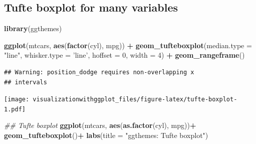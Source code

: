 \documentclass[]{krantz}
\makeatletter
\newenvironment{Shaded}{\begin{snugshade}}{\end{snugshade}}
\newcommand{\CommentTok}[1]{\textcolor[rgb]{0.56,0.35,0.01}{\textit{#1}}}
\newcommand{\DataTypeTok}[1]{\textcolor[rgb]{0.13,0.29,0.53}{#1}}
\newcommand{\DecValTok}[1]{\textcolor[rgb]{0.00,0.00,0.81}{#1}}
\newcommand{\KeywordTok}[1]{\textcolor[rgb]{0.13,0.29,0.53}{\textbf{#1}}}
\newcommand{\NormalTok}[1]{#1}
\newcommand{\OperatorTok}[1]{\textcolor[rgb]{0.81,0.36,0.00}{\textbf{#1}}}
\newcommand{\StringTok}[1]{\textcolor[rgb]{0.31,0.60,0.02}{#1}}
\newenvironment{kframe}{%
\medskip{}
\setlength{\fboxsep}{.8em}
 \def\at@end@of@kframe{}%
 \ifinner\ifhmode%
  \def\at@end@of@kframe{\end{minipage}}%
  \begin{minipage}{\columnwidth}%
 \fi\fi%
 \def\FrameCommand##1{\hskip\@totalleftmargin \hskip-\fboxsep
 \colorbox{shadecolor}{##1}\hskip-\fboxsep
     \hskip-\linewidth \hskip-\@totalleftmargin \hskip\columnwidth}%
 \MakeFramed {\advance\hsize-\width
   \@totalleftmargin\z@ \linewidth\hsize
   \@setminipage}}%
 {\par\unskip\endMakeFramed%
 \at@end@of@kframe}
\renewenvironment{Shaded}{\begin{kframe}}{\end{kframe}}
\makeatother
\begin{document}
\begin{Shaded}
\end{Shaded}

\hypertarget{tufte-boxplot-for-many-variables}{%
\subsection{Tufte boxplot for many variables}\label{tufte-boxplot-for-many-variables}}

\begin{Shaded}
\begin{Highlighting}[]
\KeywordTok{library}\NormalTok{(ggthemes)}

\KeywordTok{ggplot}\NormalTok{(mtcars, }\KeywordTok{aes}\NormalTok{(}\KeywordTok{factor}\NormalTok{(cyl), mpg)) }\OperatorTok{+}
\StringTok{  }\KeywordTok{geom_tufteboxplot}\NormalTok{(}\DataTypeTok{median.type =} \StringTok{"line"}\NormalTok{, }\DataTypeTok{whisker.type =} \StringTok{'line'}\NormalTok{, }\DataTypeTok{hoffset =} \DecValTok{0}\NormalTok{, }\DataTypeTok{width =} \DecValTok{4}\NormalTok{) }\OperatorTok{+}
\StringTok{  }\KeywordTok{geom_rangeframe}\NormalTok{() }
\end{Highlighting}
\end{Shaded}

\begin{verbatim}
## Warning: position_dodge requires non-overlapping x
## intervals
\end{verbatim}

\texttt{[image: visualizationwithggplot\_files/figure-latex/tufte-boxplot-1.pdf]}

\begin{Shaded}
\begin{Highlighting}[]
\CommentTok{## Tufte boxplot}
\KeywordTok{ggplot}\NormalTok{(mtcars, }\KeywordTok{aes}\NormalTok{(}\KeywordTok{as.factor}\NormalTok{(cyl), mpg))}\OperatorTok{+}
\StringTok{  }\KeywordTok{geom_tufteboxplot}\NormalTok{()}\OperatorTok{+}
\StringTok{  }\KeywordTok{labs}\NormalTok{(}\DataTypeTok{title =} \StringTok{"ggthemes: Tufte boxplot"}\NormalTok{)}
\end{Highlighting}
\end{Shaded}
\end{document}

